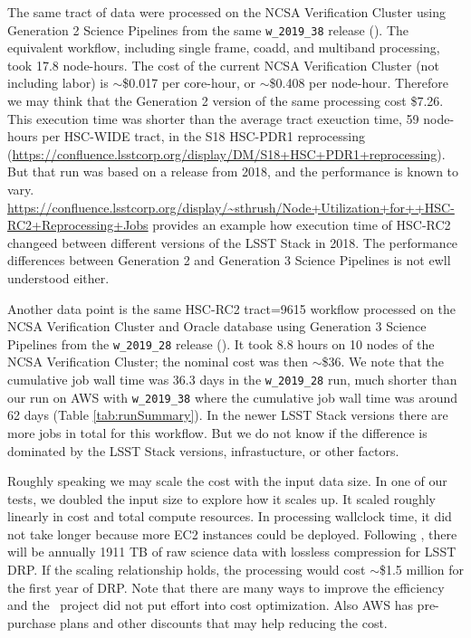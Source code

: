The same tract of data were processed on the NCSA Verification Cluster using Generation 2 Science Pipelines from the same \texttt{w\_2019\_38} release ().
The equivalent workflow, including single frame, coadd, and multiband processing, took 17.8 node-hours.
The cost of the current NCSA Verification Cluster (not including labor) is $\sim$\$0.017 per core-hour, or $\sim$\$0.408 per node-hour.
Therefore we may think that the Generation 2 version of the same processing cost \$7.26.
This execution time was shorter than the average tract exeuction time, 59 node-hours per HSC-WIDE tract, in the S18 HSC-PDR1 reprocessing (\url{https://confluence.lsstcorp.org/display/DM/S18+HSC+PDR1+reprocessing}).
But that run was based on a release from 2018, and the performance is known to vary.
\url{https://confluence.lsstcorp.org/display/~sthrush/Node+Utilization+for++HSC-RC2+Reprocessing+Jobs} provides an example how execution time of HSC-RC2 changeed between different versions of the LSST Stack in 2018.
The performance differences between Generation 2 and Generation 3 Science Pipelines is not ewll understood either.

Another data point is the same HSC-RC2 tract=9615 workflow processed on the NCSA Verification Cluster and Oracle database using Generation 3 Science Pipelines from the \texttt{w\_2019\_28} release ().
It took 8.8 hours on 10 nodes of the NCSA Verification Cluster; the nominal cost was then $\sim$\$36.
We note that the cumulative job wall time was 36.3 days in the \texttt{w\_2019\_28} run, much shorter than our run on AWS with \texttt{w\_2019\_38} where the cumulative job wall time was around 62 days (Table \ref{tab:runSummary}).
In the newer LSST Stack versions there are more jobs in total for this workflow.
But we do not know if the difference is dominated by the LSST Stack versions, infrastucture, or other factors.

Roughly speaking we may scale the cost with the input data size.
In one of our tests, we doubled the input size to explore how it scales up.
It scaled roughly linearly in cost and total compute resources.
In processing wallclock time, it did not take longer because more EC2 instances could be deployed.
Following , there will be annually 1911 TB of raw science data with lossless compression for LSST DRP.
If the scaling relationship holds, the processing would cost $\sim$\$1.5 million for the first year of DRP.
Note that there are many ways to improve the efficiency and the \poc~project did not put effort into cost optimization.
Also AWS has pre-purchase plans and other discounts that may help reducing the cost.


